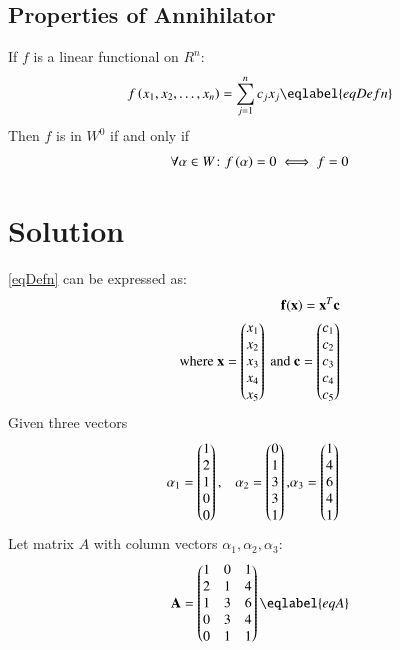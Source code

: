 \documentclass[journal,12pt,twocolumn]{IEEEtran}
\begin{document}
\subsection{Properties of Annihilator}
If $f$ is a linear functional on $R^n$:
\begin{align}
    f\brak{x_1,x_2,\dots,x_n}=\sum_{j=1}^{n}c_j x_j\eqlabel{eqDefn}
\end{align}
Then $f$ is in $W^0$ if and only if 
\begin{align}
    \forall \alpha \in W\colon f\left(\alpha\right)=0 \iff f=0
\end{align}
\section{Solution}
\eqref{eqDefn} can be expressed as:
\begin{align}
    \vec{f(x)}=\vec{x}^T\vec{c}\\
    \text{where  } \Vec{x}=\myvec{x_1\\x_2\\x_3\\x_4\\x_5} \text{ and } \vec{c}=\myvec{c_1\\c_2\\c_3\\c_4\\c_5}
\end{align}
Given three vectors
\begin{multline}
    \begin{aligned}
    &\alpha_1=\begin{pmatrix}1\\2\\1\\0\\0\end{pmatrix}, &\alpha_2=\begin{pmatrix}0\\1\\3\\3\\1\end{pmatrix},
    &\alpha_3=\begin{pmatrix}1\\4\\6\\4\\1\end{pmatrix}
    \end{aligned}
    \end{multline}
Let matrix $A$ with column vectors $\alpha_1,\alpha_2,\alpha_3$:
\begin{align}
    \Vec{A}=\myvec{1&0&1\\2&1&4\\1&3&6\\0&3&4\\0&1&1}\eqlabel{eqA}
\end{align}
\end{document}
